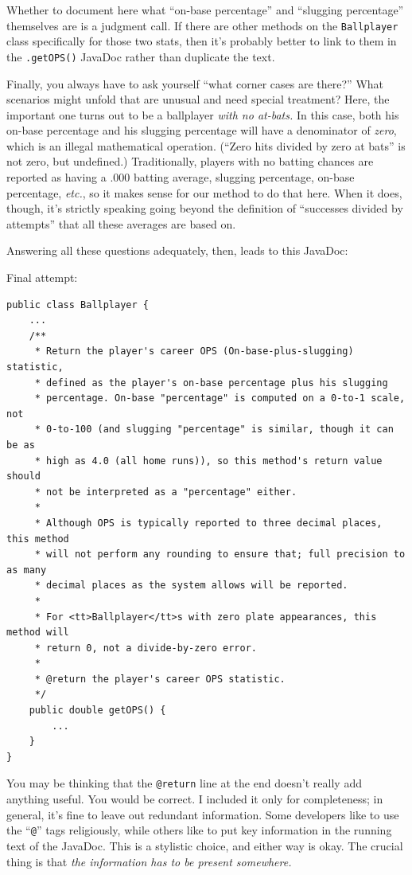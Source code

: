 Whether to document here what ``on-base percentage'' and ``slugging percentage''
themselves are is a judgment call. If there are other methods on the
\texttt{Ballplayer} class specifically for those two stats, then it's probably
better to link to them in the \texttt{.getOPS()} JavaDoc rather than duplicate
the text.

Finally, you always have to ask yourself ``what corner cases are there?'' What
scenarios might unfold that are unusual and need special treatment? Here, the
important one turns out to be a ballplayer \textit{with no at-bats.} In this
case, both his on-base percentage and his slugging percentage will have a
denominator of \textit{zero}, which is an illegal mathematical operation.
(``Zero hits divided by zero at bats'' is not zero, but undefined.)
Traditionally, players with no batting chances are reported as having a .000
batting average, slugging percentage, on-base percentage, \textit{etc.}, so it
makes sense for our method to do that here. When it does, though, it's
strictly speaking going beyond the definition of ``successes divided by
attempts'' that all these averages are based on.

Answering all these questions adequately, then, leads to this JavaDoc:

\pagebreak
Final attempt:
\vspace{-.15in}
\begin{Verbatim}[fontsize=\footnotesize,samepage=true,frame=single]
public class Ballplayer {
    ...
    /**
     * Return the player's career OPS (On-base-plus-slugging) statistic,
     * defined as the player's on-base percentage plus his slugging 
     * percentage. On-base "percentage" is computed on a 0-to-1 scale, not
     * 0-to-100 (and slugging "percentage" is similar, though it can be as
     * high as 4.0 (all home runs)), so this method's return value should
     * not be interpreted as a "percentage" either.
     * 
     * Although OPS is typically reported to three decimal places, this method
     * will not perform any rounding to ensure that; full precision to as many
     * decimal places as the system allows will be reported.
     *
     * For <tt>Ballplayer</tt>s with zero plate appearances, this method will
     * return 0, not a divide-by-zero error.
     *
     * @return the player's career OPS statistic.
     */
    public double getOPS() {
        ...
    }
}
\end{Verbatim}

You may be thinking that the \texttt{@return} line at the end doesn't really
add anything useful. You would be correct. I included it only for
completeness; in general, it's fine to leave out redundant information. Some
developers like to use the ``\texttt{@}'' tags religiously, while others like
to put key information in the running text of the JavaDoc. This is a stylistic
choice, and either way is okay. The crucial thing is that \textit{the
information has to be present somewhere.}

